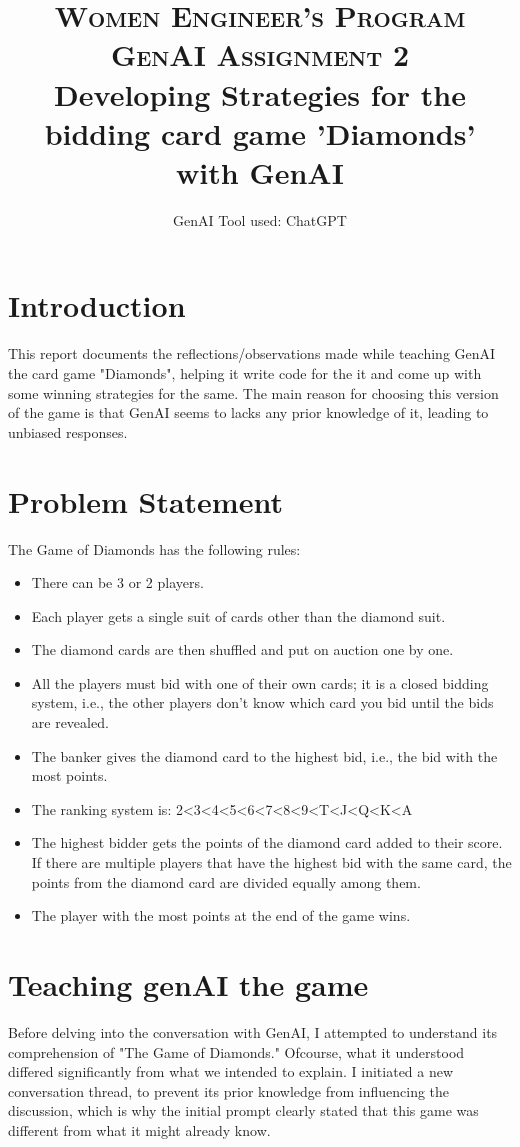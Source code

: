\documentclass[10pt,onecolumn,letterpaper]{article}
\title{
    \usefont{OT1}{bch}{b}{n}
    \normalfont \normalsize \textsc{Women Engineer's Program GenAI Assignment 2} \\ [10pt]
    \huge Developing Strategies for the bidding card game 'Diamonds' with GenAI
}
\author{\large GenAI Tool used: ChatGPT}
\begin{document}
\maketitle
{}

\section{Introduction}
This report documents the reflections/observations made while teaching GenAI the card game "Diamonds", helping it write code for the it and come up with some winning strategies for the same. The main reason for choosing this version of the game is that GenAI seems to lacks any prior knowledge of it, leading to unbiased responses.

\section{Problem Statement} 
The Game of Diamonds has the following rules:
\begin{itemize}
    \item There can be 3 or 2 players.
    \item Each player gets a single suit of cards other than the diamond suit.
    \item The diamond cards are then shuffled and put on auction one by one.
    \item All the players must bid with one of their own cards; it is a closed bidding system, i.e., the other players don’t know which card you bid until the bids are revealed.
    \item The banker gives the diamond card to the highest bid, i.e., the bid with the most points.
    \item The ranking system is: 2<3<4<5<6<7<8<9<T<J<Q<K<A
    \item The highest bidder gets the points of the diamond card added to their score. If there are multiple players that have the highest bid with the same card, the points from the diamond card are divided equally among them.
    \item The player with the most points at the end of the game wins.
\end{itemize}
\section{Teaching genAI the game}
Before delving into the conversation with GenAI, I attempted to understand its comprehension of "The Game of Diamonds." Ofcourse, what it understood  differed significantly from what we intended to explain. I initiated a new conversation thread, to prevent its prior knowledge from influencing the discussion, which is why the initial prompt clearly stated that this game was different from what it might already know.
\end{document}
